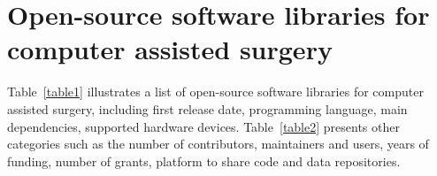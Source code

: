 \documentclass{article}
\begin{document}
\section{Open-source software libraries for computer assisted surgery}
Table~\ref{table1} illustrates a list of open-source software libraries for computer assisted surgery, including first release date, programming language, main dependencies, supported hardware devices.
Table~\ref{table2} presents other categories such as the number of contributors, maintainers and users, years of funding, number of grants, platform to share code and data repositories. 
\end{document}
